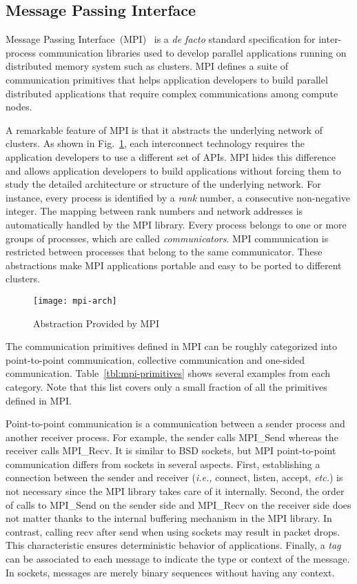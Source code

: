 \subsection{Message Passing Interface}\label{sec:i-mpi}

Message Passing Interface~(MPI)~\autocite{MessagePassingInterfaceForum2015} is
a \emph{de facto} standard specification for inter-process communication
libraries used to develop parallel applications running on distributed memory
system such as clusters. MPI defines a suite of communication primitives that
helps application developers to build parallel distributed applications that
require complex communications among compute nodes.

A remarkable feature of MPI is that it abstracts the underlying network
of clusters. As shown in Fig.~\ref{fig:mpi-arch}, each interconnect technology
requires the application developers to use a different set of APIs. MPI hides
this difference and allows application developers to build applications
without forcing them to study the detailed architecture or structure of the
underlying network. For instance, every process is identified by a \emph{rank}
number, a consecutive non-negative integer. The mapping between rank numbers
and network addresses is automatically handled by the MPI library. Every
process belongs to one or more groups of processes, which are called
\emph{communicators}. MPI communication is restricted between processes that
belong to the same communicator. These abstractions make MPI applications
portable and easy to be ported to different clusters.

\begin{figure}
    \centering
    \texttt{[image: mpi-arch]}
    \caption{Abstraction Provided by MPI}%
    \label{fig:mpi-arch}
\end{figure}

The communication primitives defined in MPI can be roughly categorized into
point-to-point communication, collective communication and one-sided
communication. Table~\ref{tbl:mpi-primitives} shows several examples from each
category. Note that this list covers only a small fraction of all the
primitives defined in MPI\@.

Point-to-point communication is a communication between a sender process and
another receiver process. For example, the sender calls MPI\_Send whereas the
receiver calls MPI\_Recv. It is similar to BSD sockets, but MPI point-to-point
communication differs from sockets in several aspects. First, establishing a
connection between the sender and receiver (\emph{i.e.,} connect, listen,
accept, \emph{etc.}) is not necessary since the MPI library takes care of it
internally. Second, the order of calls to MPI\_Send on the sender side and
MPI\_Recv on the receiver side does not matter thanks to the internal
buffering mechanism in the MPI library. In contrast, calling recv after send
when using sockets may result in packet drops. This characteristic ensures
deterministic behavior of applications. Finally, a \emph{tag} can be
associated to each message to indicate the type or context of the message. In
sockets, messages are merely binary sequences without having any context.

